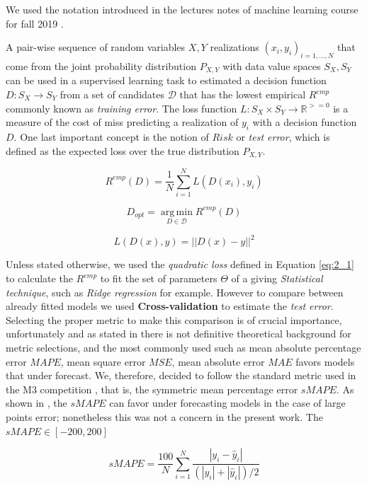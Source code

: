 We used the notation introduced in the lectures notes of machine learning course for fall 2019 \cite{ml_jacobs_h}. 

A pair-wise sequence of random variables $X,Y$ realizations $(x_{i},y_{i})_{i=1,...,N}$ that come from the joint probability distribution $P_{X,Y}$ with data value spaces $S_{X},S_{Y}$ can be used in a supervised learning task to estimated a decision function  $D:S_{X} \longrightarrow S_{Y}$ from a set of candidates $\mathcal{D}$ that has the lowest empirical $R^{emp}$ commonly known as \emph{training error}. The loss function $L:S_{X} \times S_{Y} \longrightarrow  \mathbb{R}^{>=0}$ is a measure of the cost of miss predicting a realization of $y_{i}$ with a decision function $D$. One last important concept is the notion of $Risk$ or \emph{test error}, which is defined as the expected loss over the true distribution $P_{X,Y}$.

\begin{equation}
R^{emp}(D)= \frac{1}{N} \sum_{i=1}^{N} L(D(x_{i}),y_{i})
\end{equation}

\begin{equation}
D_{opt}= \operatorname*{arg\,min}_{ D \in \mathcal{D} } R^{emp}(D)
\end{equation}

\begin{equation}
L(D(x),y)=||D(x)-y||^2
\label{eq:2_1}
\end{equation}

Unless stated otherwise, we used the \emph{quadratic loss} defined in Equation \ref{eq:2_1} to calculate the $R^{emp}$ to fit the set of parameters $\Theta$ of a giving \emph{Statistical technique}, such as \emph{Ridge regression} for example. However to compare between already fitted models we used \textbf{Cross-validation} to estimate the \emph{test error}. Selecting the proper metric to make this comparison is of crucial importance, unfortunately and as stated in \cite{gneiting2011making} there is not definitive theoretical background for metric selections, and the most commonly used such as mean absolute percentage error $MAPE$, mean square error $MSE$, mean absolute error $MAE$ favors models that under forecast. We, therefore, decided to follow the standard metric used in the M3 competition \cite{makridakis2000m3}, that is, the symmetric mean percentage error $sMAPE$. As shown in \cite{goshima2015estimating}, the  $sMAPE$ can favor under forecasting models in the case of large points error; nonetheless this was not a concern in the present work. The $sMAPE \in [-200,200]$ 

\begin{equation}
sMAPE=\frac{100}{N} \sum_{i=1}^{N}  \frac{|y_{i}-\hat{y}_{i}|}{(|y_{i}|+|\hat{y}_{i}|)/2}
\label{eq:1_6}
\end{equation}







